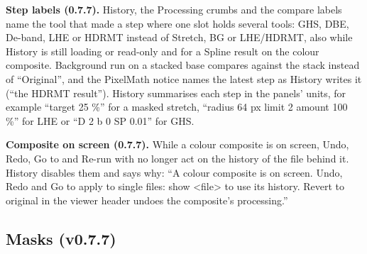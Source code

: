 \documentclass[11pt,a4paper]{article}
\begin{document}
    \textbf{Step labels (0.7.7).} History, the Processing crumbs and the compare labels name the tool that made a step where one slot holds several tools: GHS, DBE, De-band, LHE or HDRMT instead of Stretch, BG or LHE/HDRMT, also while History is still loading or read-only and for a Spline result on the colour composite. Background run on a stacked base compares against the stack instead of ``Original'', and the PixelMath notice names the latest step as History writes it (``the HDRMT result''). History summarises each step in the panels' units, for example ``target 25 \%'' for a masked stretch, ``radius 64 px \textperiodcentered{} limit 2 \textperiodcentered{} amount 100 \%'' for LHE or ``D 2 \textperiodcentered{} b 0 \textperiodcentered{} SP 0.01'' for GHS.

    \textbf{Composite on screen (0.7.7).} While a colour composite is on screen, Undo, Redo, Go to and Re-run with no longer act on the history of the file behind it. History disables them and says why: ``A colour composite is on screen. Undo, Redo and Go to apply to single files: show \textless{}file\textgreater{} to use its history. Revert to original in the viewer header undoes the composite's processing.''

    \subsection{Masks (v0.7.7)}
    \label{sec:masks}
\end{document}
